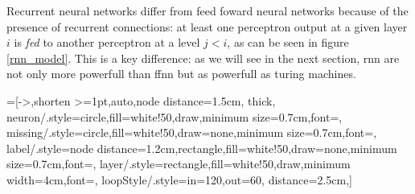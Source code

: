 Recurrent neural networks differ from feed foward neural networks because of the presence of recurrent connections: at least one perceptron output at a given layer $i$ is \textit{fed} to another perceptron
at a level $j<i$, as can be seen in figure \ref{rnn_model}. This is a key difference: as we will see in the next section, rnn are not only more powerfull than ffnn but as powerfull as turing machines.


=[->,shorten >=1pt,auto,node distance=1.5cm,
  thick,
  neuron/.style={circle,fill=white!50,draw,minimum size=0.7cm,font=\sffamily\Large\bfseries},
  missing/.style={circle,fill=white!50,draw=none,minimum size=0.7cm,font=\sffamily\Huge\bfseries},
  label/.style={node distance=1.2cm,rectangle,fill=white!50,draw=none,minimum size=0.7cm,font=\sffamily\normalsize},
  layer/.style={rectangle,fill=white!50,draw,minimum width=4cm,font=\sffamily\normalsize},
  loopStyle/.style={in=120,out=60, distance=2.5cm},]
